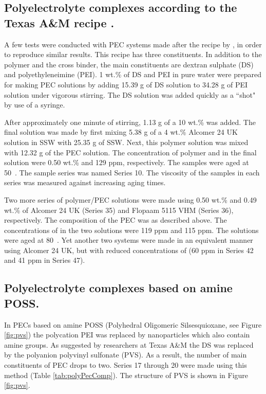 \documentclass[nanomaterials,article,submit,moreauthors,pdftex]{Definitions/mdpi}
\begin{document}
\subsection{Polyelectrolyte complexes according to the Texas A\&M recipe \citep{Johnson2010}.\label{sec:PEC}}
A few tests were conducted with PEC systems made after the recipe by \citet{Johnson2010}, in order to reproduce similar results. This recipe has three constituents. In addition to the polymer and the  cross binder, the main constituents are dextran sulphate (DS)  and polyethyleneimine (PEI).
1 wt.\% of DS and PEI in pure water were prepared for making PEC solutions by adding 15.39 g of DS solution to 34.28 g of PEI solution under vigorous stirring. The DS solution was added quickly as a ``shot" by use of a syringe.


 
After approximately one minute of stirring, 1.13 g of a 10 wt.\%  was added. The final solution was made by first mixing 5.38 g of a 4 wt.\% Alcomer 24 UK solution in SSW with 25.35 g of SSW. Next, this polymer solution was mixed with 12.32 g of the PEC solution. The concentration of polymer and  in the final solution were 0.50 wt.\% and 129 ppm, respectively. The samples were aged at 50~\celsius. The sample series was named Series 10. The viscosity of the samples in each series was measured against increasing aging times. 

Two more series of polymer/PEC solutions were made using 0.50 wt.\% and 0.49 wt.\% of Alcomer 24 UK (Series 35) and Flopaam 5115 VHM (Series 36), respectively. The composition of the PEC was as described above. The concentrations of  in the two solutions were 119 ppm and 115 ppm. The solutions were aged at 80~\celsius. Yet another two systems were made in an equivalent manner using Alcomer 24 UK, but with reduced concentrations of  (60 ppm in Series 42 and 41 ppm in Series 47).

\subsection{Polyelectrolyte complexes based on amine POSS.}
In PECs based on amine POSS (Polyhedral Oligomeric Silsesquioxane, see Figure \ref{fig:pvs}) the polycation PEI was replaced by nanoparticles which also contain amine groups. As suggested by researchers at Texas A\&M the DS was replaced by the polyanion polyvinyl sulfonate (PVS). As a result, the number of main constituents of PEC drops to two. Series 17 through 20 were made using this method (Table \ref{tab:polyPecComp}). The structure of PVS is shown in Figure \ref{fig:pvs}.
\end{document}

